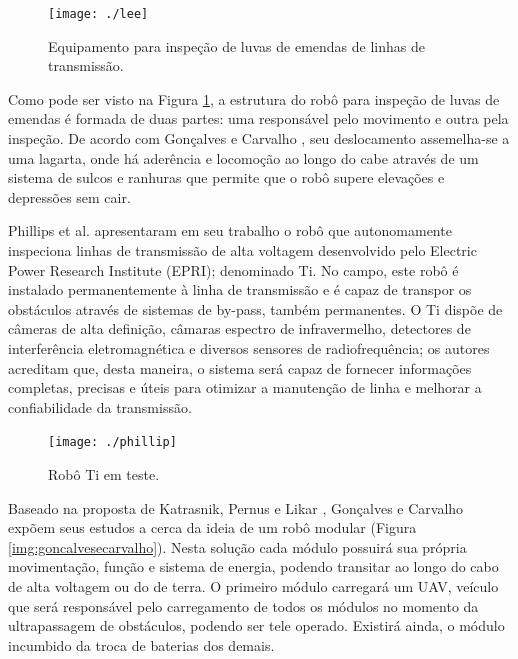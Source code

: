 \begin{figure} [h!]	
	\caption{Equipamento para inspeção de luvas de emendas de linhas de transmissão.}
	\label{img:lee}											 
	\centering													 
	\texttt{[image: ./lee]}
\end{figure}													 

Como pode ser visto na Figura \ref{img:lee}, a estrutura do robô para inspeção de luvas de emendas é formada de duas partes: uma responsável pelo movimento e outra pela inspeção. De acordo com Gonçalves e Carvalho \cite{gonccalves2013review}, seu deslocamento assemelha-se a uma lagarta, onde há aderência e locomoção ao longo do cabe através de um sistema de sulcos e ranhuras que permite que o robô supere elevações e depressões sem cair.

Phillips et al. \cite{phillips2012autonomous} apresentaram em seu trabalho o robô que autonomamente inspeciona linhas de transmissão de alta voltagem desenvolvido pelo Electric Power Research Institute (EPRI); denominado Ti. No campo, este robô é instalado permanentemente à linha de transmissão e é capaz de transpor os obstáculos através de sistemas de by-pass, também permanentes. O Ti dispõe de câmeras de alta definição, câmaras espectro de infravermelho, detectores de interferência eletromagnética e diversos sensores de radiofrequência; os autores acreditam que, desta maneira, o sistema será capaz de fornecer informações completas, precisas e úteis para otimizar a manutenção de linha e melhorar a confiabilidade da transmissão. 

\begin{figure} [h!]	
	\caption{Robô Ti em teste.}
	\label{img:phillip}											 
	\centering													 
	\texttt{[image: ./phillip]}
\end{figure}													 

Baseado na proposta de Katrasnik, Pernus e Likar \cite{katrasnik2010climbing}, Gonçalves e Carvalho \cite{gonccalves2013review} expõem seus estudos a cerca da ideia de um robô modular (Figura \ref{img:goncalvesecarvalho}). Nesta solução cada módulo possuirá sua própria movimentação, função e sistema de energia, podendo transitar ao longo do cabo de alta voltagem ou do de terra. O primeiro módulo carregará um UAV, veículo que será responsável pelo carregamento de todos os módulos no momento da ultrapassagem de obstáculos, podendo ser tele operado. Existirá ainda, o módulo incumbido da troca de baterias dos demais. 

